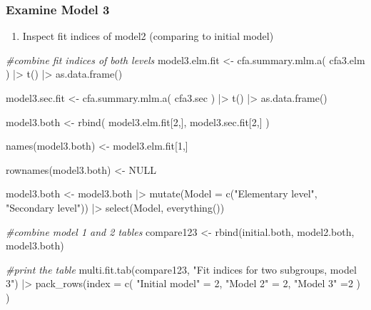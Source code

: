 \documentclass[
]{article}
\newenvironment{Shaded}{\begin{snugshade}}{\end{snugshade}}
\newcommand{\AttributeTok}[1]{\textcolor[rgb]{0.77,0.63,0.00}{#1}}
\newcommand{\CommentTok}[1]{\textcolor[rgb]{0.56,0.35,0.01}{\textit{#1}}}
\newcommand{\ConstantTok}[1]{\textcolor[rgb]{0.00,0.00,0.00}{#1}}
\newcommand{\DecValTok}[1]{\textcolor[rgb]{0.00,0.00,0.81}{#1}}
\newcommand{\FunctionTok}[1]{\textcolor[rgb]{0.00,0.00,0.00}{#1}}
\newcommand{\NormalTok}[1]{#1}
\newcommand{\OtherTok}[1]{\textcolor[rgb]{0.56,0.35,0.01}{#1}}
\newcommand{\SpecialCharTok}[1]{\textcolor[rgb]{0.00,0.00,0.00}{#1}}
\newcommand{\StringTok}[1]{\textcolor[rgb]{0.31,0.60,0.02}{#1}}
\providecommand{\tightlist}{%
  \setlength{\itemsep}{0pt}\setlength{\parskip}{0pt}}
\begin{document}
\hypertarget{examine-model-3}{%
\subsubsection{Examine Model 3}\label{examine-model-3}}

\begin{enumerate}
\def\labelenumi{(\arabic{enumi})}
\tightlist
\item
  Inspect fit indices of model2 (comparing to initial model)
\end{enumerate}

\begin{Shaded}
\begin{Highlighting}[]
\CommentTok{\#combine fit indices of both levels}
\NormalTok{model3.elm.fit }\OtherTok{\textless{}{-}} 
  \FunctionTok{cfa.summary.mlm.a}\NormalTok{(}
\NormalTok{    cfa3.elm}
\NormalTok{    ) }\SpecialCharTok{|\textgreater{}} 
  \FunctionTok{t}\NormalTok{() }\SpecialCharTok{|\textgreater{}} 
  \FunctionTok{as.data.frame}\NormalTok{()}

\NormalTok{model3.sec.fit }\OtherTok{\textless{}{-}} 
  \FunctionTok{cfa.summary.mlm.a}\NormalTok{(}
\NormalTok{    cfa3.sec}
\NormalTok{    ) }\SpecialCharTok{|\textgreater{}} 
  \FunctionTok{t}\NormalTok{() }\SpecialCharTok{|\textgreater{}} 
  \FunctionTok{as.data.frame}\NormalTok{()}

\NormalTok{model3.both }\OtherTok{\textless{}{-}} 
  \FunctionTok{rbind}\NormalTok{(}
\NormalTok{    model3.elm.fit[}\DecValTok{2}\NormalTok{,], }
\NormalTok{    model3.sec.fit[}\DecValTok{2}\NormalTok{,]}
\NormalTok{    ) }

\FunctionTok{names}\NormalTok{(model3.both) }\OtherTok{\textless{}{-}}\NormalTok{ model3.elm.fit[}\DecValTok{1}\NormalTok{,]}

\FunctionTok{rownames}\NormalTok{(model3.both) }\OtherTok{\textless{}{-}} \ConstantTok{NULL}

\NormalTok{model3.both }\OtherTok{\textless{}{-}} 
\NormalTok{  model3.both }\SpecialCharTok{|\textgreater{}} 
  \FunctionTok{mutate}\NormalTok{(}\AttributeTok{Model =} \FunctionTok{c}\NormalTok{(}\StringTok{"Elementary level"}\NormalTok{,}
    \StringTok{"Secondary level"}\NormalTok{)) }\SpecialCharTok{|\textgreater{}} 
  \FunctionTok{select}\NormalTok{(Model, }\FunctionTok{everything}\NormalTok{())}

\CommentTok{\#combine model 1 and 2 tables}
\NormalTok{compare123 }\OtherTok{\textless{}{-}} \FunctionTok{rbind}\NormalTok{(initial.both, model2.both, model3.both)}

\CommentTok{\#print the table}
\FunctionTok{multi.fit.tab}\NormalTok{(compare123, }
              \StringTok{"Fit indices for two subgroups, model 3"}\NormalTok{) }\SpecialCharTok{|\textgreater{}} 
  \FunctionTok{pack\_rows}\NormalTok{(}\AttributeTok{index =} \FunctionTok{c}\NormalTok{(}
    \StringTok{"Initial model"} \OtherTok{=} \DecValTok{2}\NormalTok{,}
    \StringTok{"Model 2"} \OtherTok{=} \DecValTok{2}\NormalTok{,}
    \StringTok{"Model 3"} \OtherTok{=}\DecValTok{2}
\NormalTok{  )}
\NormalTok{  )}
\end{Highlighting}
\end{Shaded}
\end{document}
